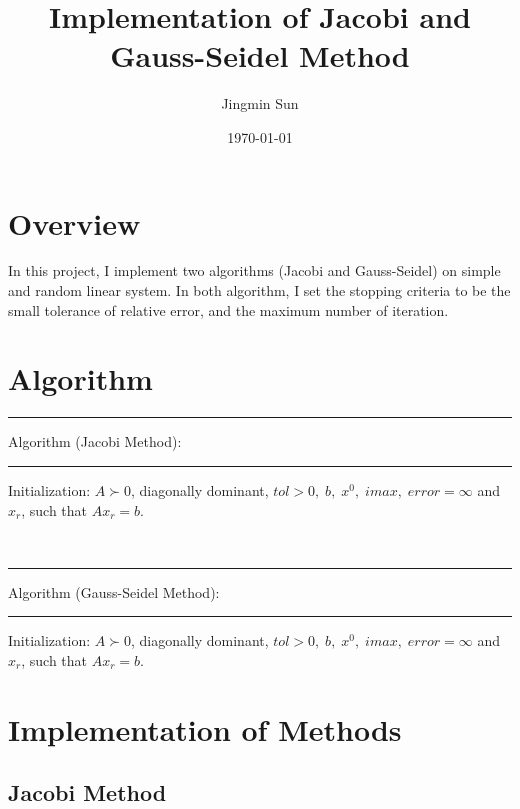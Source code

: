 \documentclass{article}
\title{Implementation of Jacobi and Gauss-Seidel Method}
\author{Jingmin Sun}
\date{\today}
\begin{document}
\maketitle
\tableofcontents
\pagebreak

\section{Overview}
In this project, I implement two algorithms (Jacobi and Gauss-Seidel) on simple and random linear system. In both algorithm, I set the stopping criteria to be the small tolerance of relative error, and the maximum number of iteration.

\section{Algorithm}
\hrule
Algorithm (Jacobi Method):
\hrule
\begin{algorithm}[H]
\SetAlgoLined
Initialization: $A \succ 0$, diagonally dominant, $tol>0,\; b, \; x^0, \; imax, \; error = \infty $ and $x_r$, such that $Ax_r=b$.\\
\end{algorithm}

~\\

\hrule
Algorithm (Gauss-Seidel Method):
\hrule
\begin{algorithm}[H]
\SetAlgoLined
Initialization: $A \succ 0$, diagonally dominant, $tol>0,\; b, \; x^0,  \; imax, \; error = \infty $ and $x_r$, such that $Ax_r=b$.\\
\end{algorithm}

\section{Implementation of Methods}
\subsection{Jacobi Method}

\end{document}
